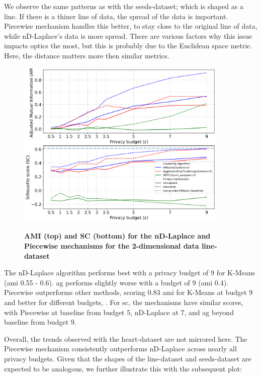 We observe the same patterns as with the seeds-dataset; which is shaped as a line.
If there is a thiner line of data, the spread of the data is important. Piecewise mechanism handles this better, to stay close to the original line of data, while nD-Laplace's data is more spread. There are various factors why this issue impacts \gls{optics} the most, but this is probably due to the Euclidean space metric. Here, the distance matters more then similar metrics.
\newpage
\begin{figure}[H]
  \centering
  \caption{\textbf{AMI (top) and SC (bottom) for the nD-Laplace and Piecewise mechanisms for the 2-dimensional data line-dataset}}
  \includegraphics[width=0.9\textwidth]{Results/nd-laplace/nd-Laplace/line-dataset/ami-and-sc_2_dimensions.png}
  \label{fig:validation-line-dataset_comparison_2d-laplace}
\end{figure}
The nD-Laplace algorithm performs best with a privacy budget of 9 for K-Means (\gls{ami} 0.55 - 0.6).
\gls{ag} performs slightly worse with a budget of 9 (\gls{ami} 0.4).
Piecewise outperforms other methods, scoring 0.83 \gls{ami} for K-Means at budget 9 and better for different budgets, .
For \gls{sc}, the mechanisms have similar scores, with Piecewise at baseline from budget 5, nD-Laplace at 7, and \gls{ag} beyond baseline from budget 9.

Overall, the trends observed with the heart-dataset are not mirrored here. The Piecewise mechanism consistently outperforms nD-Laplace across nearly all privacy budgets. Given that the shapes of the line-dataset and seeds-dataset are expected to be analogous, we further illustrate this with the subsequent plot:

